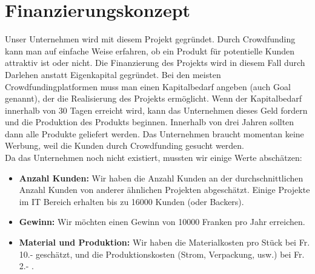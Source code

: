 \section{Finanzierungskonzept}
Unser Unternehmen wird mit diesem Projekt gegr\"undet. Durch Crowdfunding kann man auf einfache Weise erfahren, ob ein Produkt f\"ur potentielle Kunden attraktiv ist oder nicht. Die Finanzierung des Projekts wird in diesem Fall durch Darlehen anstatt Eigenkapital gegr\"undet. Bei den meisten Crowdfundingplatformen muss man einen Kapitalbedarf angeben (auch Goal genannt), der die Realisierung des Projekts erm\"oglicht. Wenn der Kapitalbedarf innerhalb von 30 Tagen erreicht wird, kann das Unternehmen dieses Geld fordern und die Produktion des Produkts beginnen. Innerhalb von drei Jahren sollten dann alle Produkte geliefert werden. Das Unternehmen braucht momentan keine Werbung, weil die Kunden durch Crowdfunding gesucht werden.\\
Da das Unternehmen noch nicht existiert, mussten wir einige Werte absch\"atzen:\\
\begin{itemize}
\item \textbf{Anzahl Kunden:} Wir haben die Anzahl Kunden an der durchschnittlichen Anzahl Kunden von anderer \"ahnlichen Projekten abgesch\"atzt. Einige Projekte im IT Bereich erhalten bis zu 16000 Kunden (oder Backers). 
\item \textbf{Gewinn:} Wir m\"ochten einen Gewinn von 10000 Franken pro Jahr erreichen.
\item \textbf{Material und Produktion:} Wir haben die Materialkosten pro St\"uck bei Fr. 10.- gesch\"atzt, und die Produktionskosten (Strom, Verpackung, usw.) bei Fr. 2.- .
\end{itemize}

